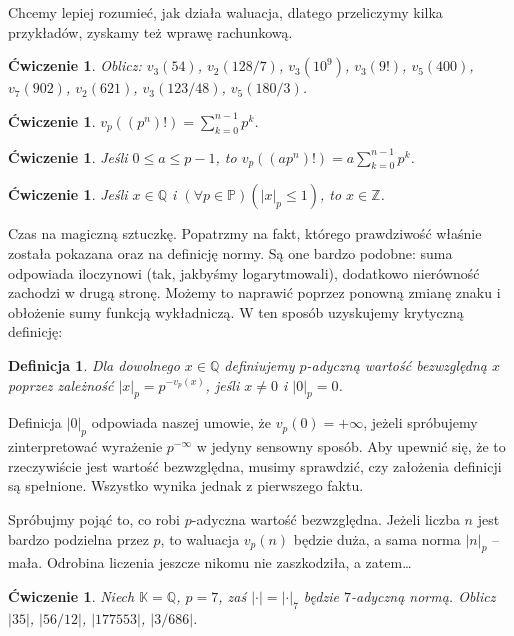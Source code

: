 \documentclass[a4paper,fleqn,9pt]{extarticle}
\newtheorem{prb}[prbh]{\'Cwiczenie}
\newtheorem{dff}{Definicja}
\begin{document}
Chcemy lepiej rozumieć, jak działa waluacja, dlatego przeliczymy kilka przykładów, zyskamy też wprawę rachunkową. 

\begin{prb}Oblicz: $v_{3}(54)$, $v_{2}(128/7)$, $v_{3}(10^9)$, $v_3(9!)$, $v_5(400)$, $v_7(902)$, $v_2(621)$, $v_3(123/48)$, $v_5(180/3)$.\end{prb}

\begin{prb}$v_p((p^n)!) = \sum_{k=0}^{n-1}p^k$.\end{prb}

\begin{prb}Jeśli $0\le a\le p-1$, to $v_p((ap^n)!) = a\sum_{k=0}^{n-1}p^k$.\end{prb}

\begin{prb}Jeśli $x\in \mathbb Q$ i $(\forall p\in\mathbb P)(|x|_p \le 1)$, to $x\in\mathbb Z$.\end{prb}

Czas na magiczną sztuczkę. Popatrzmy na fakt, którego prawdziwość właśnie została pokazana oraz na definicję normy. Są one bardzo podobne: suma odpowiada iloczynowi (tak, jakbyśmy logarytmowali), dodatkowo nierówność zachodzi w drugą stronę. Możemy to naprawić poprzez ponowną zmianę znaku i obłożenie sumy funkcją wykładniczą. W ten sposób uzyskujemy krytyczną definicję:

\begin{dff}Dla dowolnego $x\in\mathbb Q$ definiujemy $p$-adyczną wartość bezwzględną $x$ poprzez zależność $|x|_p = p^{-v_p(x)}$, jeśli $x\neq 0$ i $|0|_p = 0$. \end{dff}

Definicja $|0|_p$ odpowiada naszej umowie, że $v_p(0) = + \infty$, jeżeli spróbujemy zinterpretować wyrażenie $p^{-\infty}$ w jedyny sensowny sposób. Aby upewnić się, że to rzeczywiście jest wartość bezwzględna, musimy sprawdzić, czy założenia definicji są spełnione. Wszystko wynika jednak z pierwszego faktu.

Spróbujmy pojąć to, co robi $p$-adyczna wartość bezwzględna. Jeżeli liczba $n$ jest bardzo podzielna przez $p$, to waluacja $v_p(n)$ będzie duża, a sama norma $|n|_p$ -- mała. Odrobina liczenia jeszcze nikomu nie zaszkodziła, a zatem…

\begin{prb}Niech $\mathbb K = \mathbb Q$, $p=7$, zaś $|\cdot| = |\cdot|_7$ będzie $7$-adyczną normą. Oblicz $|35|$, $|56/12|$, $|177553|$, $|3/686|$.\end{prb}
\end{document}
